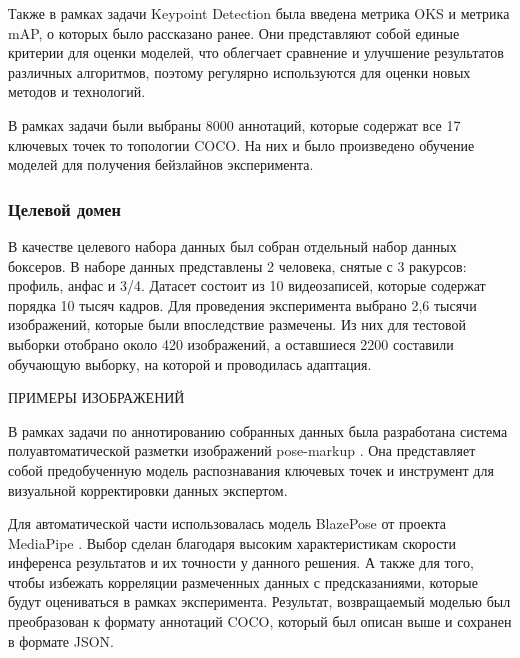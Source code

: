 Также в рамках задачи Keypoint Detection была введена метрика OKS и метрика mAP, о которых было рассказано ранее. Они представляют собой единые критерии для оценки моделей, что облегчает сравнение и улучшение результатов различных алгоритмов, поэтому регулярно используются для оценки  новых методов и технологий.

В рамках задачи были выбраны 8000 аннотаций, которые содержат все 17 ключевых точек то топологии COCO. На них и было произведено обучение моделей для получения бейзлайнов эксперимента.

\subsubsection*{Целевой домен}




В качестве целевого набора данных был собран отдельный набор данных боксеров. В наборе данных представлены 2 человека, снятые с 3 ракурсов: профиль, анфас и 3/4. Датасет состоит из 10 видеозаписей, которые содержат порядка 10 тысяч кадров. Для проведения эксперимента выбрано 2,6 тысячи изображений, которые были впоследствие размечены. Из них для тестовой выборки отобрано около 420 изображений, а оставшиеся 2200 составили обучающую выборку, на которой и проводилась адаптация.

ПРИМЕРЫ ИЗОБРАЖЕНИЙ

В рамках задачи по аннотированию собранных данных была разработана система полуавтоматической разметки изображений pose-markup \cite{pose_markup}. Она представляет собой предобученную модель распознавания ключевых точек и инструмент для визуальной корректировки данных экспертом.

Для автоматической части использовалась модель BlazePose от проекта MediaPipe \cite{mediapipe}. Выбор сделан благодаря высоким характеристикам скорости инференса результатов и их точности у данного решения. А также для того, чтобы избежать корреляции размеченных данных с предсказаниями, которые будут оцениваться в рамках эксперимента. Результат, возвращаемый моделью был преобразован к формату аннотаций COCO, который был описан выше и сохранен в формате JSON. 

